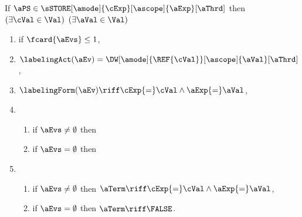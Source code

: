 \begin{scope}
  \label{def:semaddr}

  \noindent
  If $\aPS \in \sSTORE[\amode]{\cExp}[\ascope]{\aExp}[\aThrd]$ then
  $(\exists\cVal\in\Val)$
  $(\exists\aVal\in\Val)$
  \begin{multicols}{2}
    \begin{enumerate}[topsep=0pt,label=(\textsc{w}\arabic*),ref=\textsc{w}\arabic*]
    \item \label{write-E-addr}
      if $\fcard{\aEvs}\leq1$,
    \item \label{write-lambda-addr}
      $\labelingAct(\aEv) = \DW[\amode]{\REF{\cVal}}[\ascope]{\aVal}[\aThrd]$,
    \item \label{write-kappa-addr}
      \begin{math}
        \labelingForm(\aEv) \riff
        \cExp{=}\cVal
        \land \aExp{=}\aVal
      \end{math},      
    \item[] 
      \begin{enumerate}[leftmargin=0pt]
      \item \label{write-tau-dep-addr}
        if $\aEvs\neq\emptyset$ then 
        \makebox[0pt][l]{\begin{math}
          \aTr{\bEvs}{\bForm} \riff 
          (\cExp{=}\cVal)
          \limplies 
          \bForm
          [\aExp/\REF{\cVal}]
          [\aExp{=}\aVal/\Q{\REF{\cVal}}]
          [\TRUE/\A{\cVal}]
          [(\cExp{\neq}\Aother\land\A{\Aother})/\A{\Aother{\neq}\cVal}]
         \end{math},}
      \item \label{write-tau-empty-addr}
        if $\aEvs=\emptyset$ then
        \makebox[0pt][l]{\begin{math}
          (\forall\dVal)
        \end{math}        
        \begin{math}
          \aTr{\bEvs}{\bForm} \riff 
          (\cExp{=}\dVal)
          \limplies 
          \bForm
          [\aExp/\REF{\dVal}]
          [\FALSE/\Q{\REF{\dVal}}]
          [\FALSE/\A{\Aother}],
         \end{math}}
      \end{enumerate}
      \columnbreak
    \item[] 
      \begin{enumerate}[leftmargin=0pt]
      \item \label{write-term-nonempty-addr}
        if $\aEvs\neq\emptyset$ then $\aTerm \riff \cExp{=}\cVal \land \aExp{=}\aVal$,
      \item \label{write-term-empty-addr}
        if $\aEvs=\emptyset$ then $\aTerm \riff \FALSE$.
      \end{enumerate}
    \end{enumerate}
  \end{multicols}


\end{scope}
